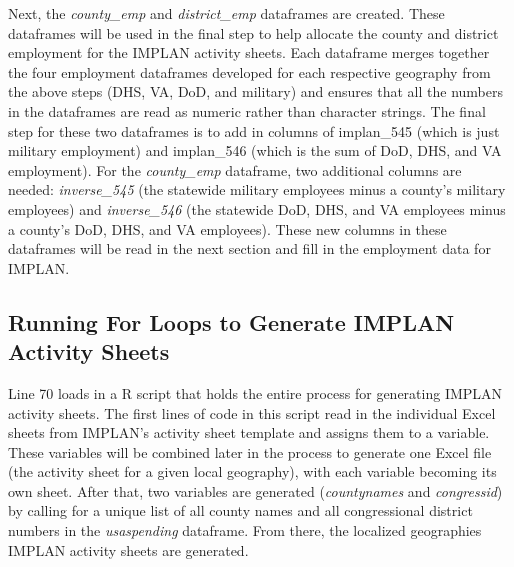 \documentclass[
]{book}
\begin{document}
Next, the \emph{county\_emp} and \emph{district\_emp} dataframes are created. These dataframes will be used in the final step to help allocate the county and district employment for the IMPLAN activity sheets. Each dataframe merges together the four employment dataframes developed for each respective geography from the above steps (DHS, VA, DoD, and military) and ensures that all the numbers in the dataframes are read as numeric rather than character strings. The final step for these two dataframes is to add in columns of implan\_545 (which is just military employment) and implan\_546 (which is the sum of DoD, DHS, and VA employment). For the \emph{county\_emp} dataframe, two additional columns are needed: \emph{inverse\_545} (the statewide military employees minus a county's military employees) and \emph{inverse\_546} (the statewide DoD, DHS, and VA employees minus a county's DoD, DHS, and VA employees). These new columns in these dataframes will be read in the next section and fill in the employment data for IMPLAN.

\hypertarget{for-loop}{%
\subsection{Running For Loops to Generate IMPLAN Activity Sheets}\label{for-loop}}

Line 70 loads in a R script that holds the entire process for generating IMPLAN activity sheets. The first lines of code in this script read in the individual Excel sheets from IMPLAN's activity sheet template and assigns them to a variable. These variables will be combined later in the process to generate one Excel file (the activity sheet for a given local geography), with each variable becoming its own sheet. After that, two variables are generated (\emph{countynames} and \emph{congressid}) by calling for a unique list of all county names and all congressional district numbers in the \emph{usaspending} dataframe. From there, the localized geographies IMPLAN activity sheets are generated.
\end{document}
